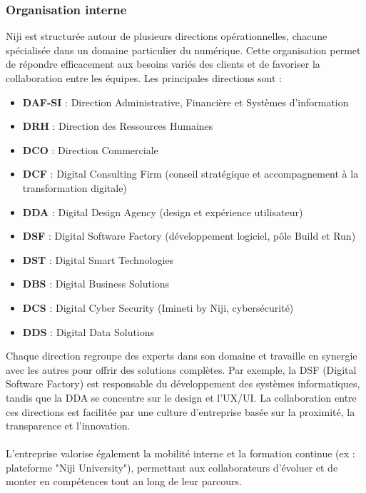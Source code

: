 \documentclass[12pt]{article}
\begin{document}
\subsubsection{Organisation interne}
Niji est structurée autour de plusieurs directions opérationnelles, chacune spécialisée dans un domaine particulier du numérique. Cette organisation permet de répondre efficacement aux besoins variés des clients et de favoriser la collaboration entre les équipes. Les principales directions sont :
\\
\begin{itemize}
    \item \textbf{DAF-SI} : Direction Administrative, Financière et Systèmes d'information
    \item \textbf{DRH} : Direction des Ressources Humaines
    \item \textbf{DCO} : Direction Commerciale
    \item \textbf{DCF} : Digital Consulting Firm (conseil stratégique et accompagnement à la transformation digitale)
    \item \textbf{DDA} : Digital Design Agency (design et expérience utilisateur)
    \item \textbf{DSF} : Digital Software Factory (développement logiciel, pôle Build et Run)
    \item \textbf{DST} : Digital Smart Technologies
    \item \textbf{DBS} : Digital Business Solutions
    \item \textbf{DCS} : Digital Cyber Security (Imineti by Niji, cybersécurité)
    \item \textbf{DDS} : Digital Data Solutions\\
\end{itemize}
\noindent
Chaque direction regroupe des experts dans son domaine et travaille en synergie avec les autres pour offrir des solutions complètes.
Par exemple, la DSF (Digital Software Factory) est responsable du développement des systèmes informatiques, tandis que la DDA se concentre sur le design et l’UX/UI.
La collaboration entre ces directions est facilitée par une culture d’entreprise basée sur la proximité, la transparence et l’innovation.
\\\\
L’entreprise valorise également la mobilité interne et la formation continue (ex : plateforme "Niji University"), permettant aux collaborateurs d’évoluer et de monter en compétences tout au long de leur parcours.
\end{document}
